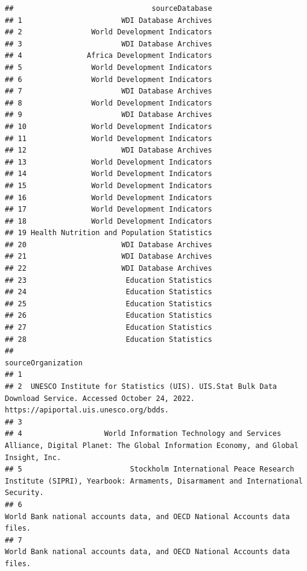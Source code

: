 \documentclass[
]{article}
\begin{document}
\begin{verbatim}
##                                sourceDatabase
## 1                       WDI Database Archives
## 2                World Development Indicators
## 3                       WDI Database Archives
## 4               Africa Development Indicators
## 5                World Development Indicators
## 6                World Development Indicators
## 7                       WDI Database Archives
## 8                World Development Indicators
## 9                       WDI Database Archives
## 10               World Development Indicators
## 11               World Development Indicators
## 12                      WDI Database Archives
## 13               World Development Indicators
## 14               World Development Indicators
## 15               World Development Indicators
## 16               World Development Indicators
## 17               World Development Indicators
## 18               World Development Indicators
## 19 Health Nutrition and Population Statistics
## 20                      WDI Database Archives
## 21                      WDI Database Archives
## 22                      WDI Database Archives
## 23                       Education Statistics
## 24                       Education Statistics
## 25                       Education Statistics
## 26                       Education Statistics
## 27                       Education Statistics
## 28                       Education Statistics
##                                                                                                                               sourceOrganization
## 1                                                                                                                                               
## 2  UNESCO Institute for Statistics (UIS). UIS.Stat Bulk Data Download Service. Accessed October 24, 2022. https://apiportal.uis.unesco.org/bdds.
## 3                                                                                                                                               
## 4                   World Information Technology and Services Alliance, Digital Planet: The Global Information Economy, and Global Insight, Inc.
## 5                         Stockholm International Peace Research Institute (SIPRI), Yearbook: Armaments, Disarmament and International Security.
## 6                                                                      World Bank national accounts data, and OECD National Accounts data files.
## 7                                                                      World Bank national accounts data, and OECD National Accounts data files.

\end{verbatim}
\end{document}
